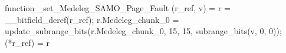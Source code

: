function _set_Medeleg_SAMO_Page_Fault (r_ref, v) = {
    r = __bitfield_deref(r_ref);
    r.Medeleg_chunk_0 = update_subrange_bits(r.Medeleg_chunk_0, 15, 15, subrange_bits(v, 0, 0));
    (*r_ref) = r
}
